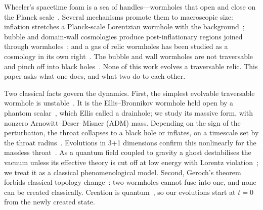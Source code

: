 \documentclass[twocolumn,floatfix,aps,prd,superscriptaddress,nofootinbib]{revtex4-2}
\begin{document}
Wheeler's spacetime foam is a sea of handles---wormholes that open and close on the Planck scale~\cite{wheeler1955,wheeler1957,misner_wheeler1957}. Several mechanisms promote them to macroscopic size: inflation stretches a Planck-scale Lorentzian wormhole with the background~\cite{roman1993}; bubble and domain-wall cosmologies produce post-inflationary regions joined through wormholes~\cite{garriga2016,deng2017,deng_vilenkin2017,gouttenoire2024}; and a gas of relic wormholes has been studied as a cosmology in its own right~\cite{kirillov2008,kirillov2011}. The bubble and wall wormholes are not traversable and pinch off into black holes~\cite{deng2017,deng_vilenkin2017}. None of this work evolves a traversable relic. This paper asks what one does, and what two do to each other.

Two classical facts govern the dynamics. First, the simplest evolvable traversable wormhole is unstable~\cite{gonzalez2009lin,bronnikov2011,cremona2019}. It is the Ellis--Bronnikov wormhole held open by a phantom scalar~\cite{ellis1973,bronnikov1973,morris_thorne1988,visser1995}, which Ellis called a drainhole; we study its massive form, with nonzero Arnowitt--Deser--Misner (ADM) mass. Depending on the sign of the perturbation, the throat collapses to a black hole or inflates, on a timescale set by the throat radius~\cite{hayward1999,shinkai2002,gonzalez2009,doroshkevich2009,hayward2009,novikov2019}. Evolutions in 3+1 dimensions confirm this nonlinearly for the massless throat~\cite{shirokov2026}. As a quantum field coupled to gravity a ghost destabilises the vacuum unless its effective theory is cut off at low energy with Lorentz violation~\cite{cline2004}; we treat it as a classical phenomenological model. Second, Geroch's theorem forbids classical topology change~\cite{geroch1967,tipler1977}: two wormholes cannot fuse into one, and none can be created classically. Creation is quantum~\cite{hawking1988}, so our evolutions start at $t=0$ from the newly created state.
\end{document}
